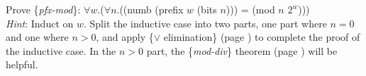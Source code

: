 \begin{ExerciseList}
\Exercise \label{pfx-mod}
Prove \{\emph{pfx-mod}\}:
$\forall w$.($\forall n$.((numb (prefix $w$ (bits $n$))) = (mod $n$ $2^w$))) \\
\emph{Hint}: Induct on $w$. Split the inductive case into two parts,
one part where $n = 0$ and one where $n > 0$, and apply
\{$\vee$ elimination\} (page \pageref{fig-02-deduction-rules}) to complete
the proof of the inductive case.
In the $n > 0$ part, the \{\emph{mod-div}\} theorem
(page \pageref{modular-division}) will be helpful.

%
%

\end{ExerciseList}
